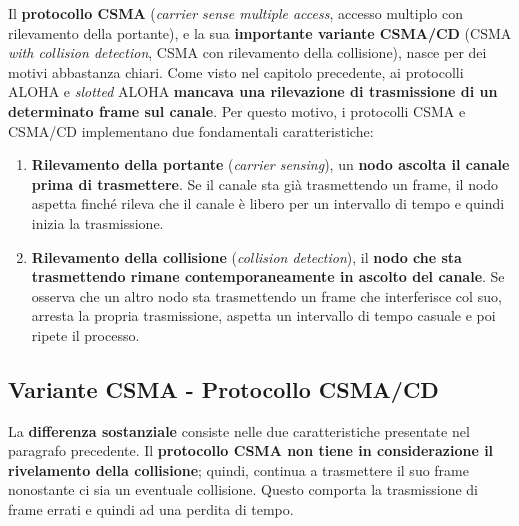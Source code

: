\documentclass[a4paper]{article}
\begin{document}
	Il \textcolor{Red3}{\textbf{protocollo CSMA}} (\emph{carrier sense multiple access}, accesso multiplo con rilevamento della portante), e la sua \textbf{importante variante CSMA/CD} (CSMA \emph{with collision detection}, CSMA con rilevamento della collisione), nasce per dei motivi abbastanza chiari. Come visto nel capitolo precedente, ai protocolli ALOHA e \emph{slotted} ALOHA \textbf{mancava una rilevazione di trasmissione di un determinato frame sul canale}. Per questo motivo, i protocolli CSMA e CSMA/CD implementano due fondamentali caratteristiche:
	\begin{enumerate}
		\item \textcolor{Red3}{\textbf{Rilevamento della portante}} (\emph{carrier sensing}), un \textbf{nodo ascolta il canale prima di trasmettere}. Se il canale sta già trasmettendo un frame, il nodo aspetta finché rileva che il canale è libero per un intervallo di tempo e quindi inizia la trasmissione.
		
		\item \textcolor{Red3}{\textbf{Rilevamento della collisione}} (\emph{collision detection}), il \textbf{nodo che sta trasmettendo rimane contemporaneamente in ascolto del canale}. Se osserva che un altro nodo sta trasmettendo un frame che interferisce col suo, arresta la propria trasmissione, aspetta un intervallo di tempo casuale e poi ripete il processo.
	\end{enumerate}

	\subsection{Variante CSMA - Protocollo CSMA/CD}
	
	La \textbf{differenza sostanziale} consiste nelle due caratteristiche presentate nel paragrafo precedente. Il \textbf{protocollo CSMA non tiene in considerazione il rivelamento della collisione}; quindi, continua a trasmettere il suo frame nonostante ci sia un eventuale collisione. Questo comporta la trasmissione di frame errati e quindi ad una perdita di tempo.\newline
	
\end{document}

